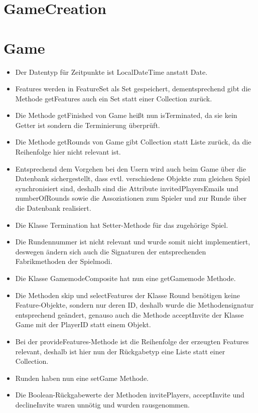 \documentclass[a4paper]{scrreprt}
\begin{document}
\section{GameCreation}

\section{Game}
\begin{itemize}
	\item Der Datentyp für Zeitpunkte ist LocalDateTime anstatt Date.
	\item Features werden in FeatureSet als Set gespeichert, dementsprechend gibt die Methode getFeatures auch ein Set statt einer Collection zurück.
	\item Die Methode getFinished von Game heißt nun isTerminated, da sie kein Getter ist sondern die Terminierung überprüft.
	\item Die Methode getRounds von Game gibt Collection statt Liste zurück, da die Reihenfolge hier nicht relevant ist.
	\item Entsprechend dem Vorgehen bei den Usern wird auch beim Game über die Datenbank sichergestellt, dass evtl. verschiedene Objekte zum gleichen Spiel synchronisiert sind, deshalb sind die Attribute invitedPlayersEmails und numberOfRounds sowie die Assoziationen zum Spieler und zur Runde über die Datenbank realisiert.
	\item Die Klasse Termination hat Setter-Methode für das zugehörige Spiel.
	\item Die Rundennummer ist nicht relevant und wurde somit nicht implementiert, deswegen ändern sich auch die Signaturen der entsprechenden Fabrikmethoden der Spielmodi.
	\item Die Klasse GamemodeComposite hat nun eine getGamemode Methode.
	\item Die Methoden skip und selectFeatures der Klasse Round benötigen keine Feature-Objekte, sondern nur deren ID, deshalb wurde die Methodensignatur entsprechend geändert, genauso auch die Methode acceptInvite der Klasse Game mit der \newline PlayerID statt einem Objekt.
	\item Bei der provideFeatures-Methode ist die Reihenfolge der erzeugten Features relevant, deshalb ist hier nun der Rückgabetyp eine Liste statt einer Collection.
	\item Runden haben nun eine setGame Methode.
	\item Die Boolean-Rückgabewerte der Methoden invitePlayers, acceptInvite und declineInvite waren unnötig und wurden rausgenommen.

\end{itemize}
\end{document}
